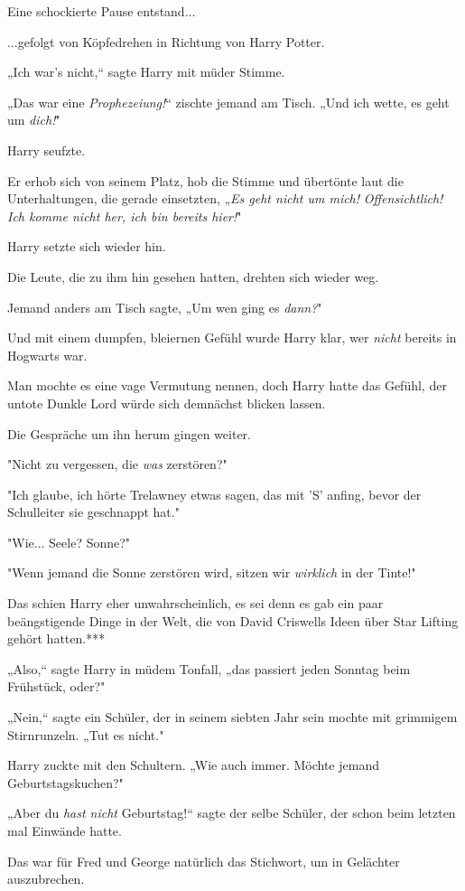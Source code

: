 {Eine schockierte Pause entstand...

...gefolgt von Köpfedrehen in Richtung von Harry Potter.

„Ich war's nicht,“ sagte Harry mit müder Stimme.

„Das war eine \emph{Prophezeiung!}“ zischte jemand am Tisch. „Und ich wette, es geht um \emph{dich!}"

Harry seufzte.

Er erhob sich von seinem Platz, hob die Stimme und übertönte laut die Unterhaltungen, die gerade einsetzten, „\emph{Es geht nicht um mich!} \emph{Offensichtlich! Ich komme nicht her, ich bin bereits hier!}"

Harry setzte sich wieder hin.

Die Leute, die zu ihm hin gesehen hatten, drehten sich wieder weg.

Jemand anders am Tisch sagte, „Um wen ging es \emph{dann?}"

Und mit einem dumpfen, bleiernen Gefühl wurde Harry klar, wer \emph{nicht} bereits in Hogwarts war.

Man mochte es eine vage Vermutung nennen, doch Harry hatte das Gefühl, der untote Dunkle Lord würde sich demnächst blicken lassen.

Die Gespräche um ihn herum gingen weiter.

"Nicht zu vergessen, die \emph{was} zerstören?"

"Ich glaube, ich hörte Trelawney etwas sagen, das mit 'S' anfing, bevor der Schulleiter sie geschnappt hat."

"Wie... Seele? Sonne?"

"Wenn jemand die Sonne zerstören wird, sitzen wir \emph{wirklich} in der Tinte!"

Das schien Harry eher unwahrscheinlich, es sei denn es gab ein paar beängstigende Dinge in der Welt, die von David Criswells Ideen über Star Lifting gehört hatten.***

„Also,“ sagte Harry in müdem Tonfall, „das passiert jeden Sonntag beim Frühstück, oder?"

„Nein,“ sagte ein Schüler, der in seinem siebten Jahr sein mochte mit grimmigem Stirnrunzeln. „Tut es nicht."

Harry zuckte mit den Schultern. „Wie auch immer. Möchte jemand Geburtstagskuchen?"

„Aber du \emph{hast nicht} Geburtstag!“ sagte der selbe Schüler, der schon beim letzten mal Einwände hatte.

Das war für Fred und George natürlich das Stichwort, um in Gelächter auszubrechen.

}
